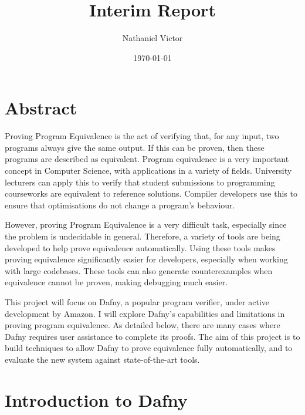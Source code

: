 \documentclass[a4paper, 11pt]{article}
\title{Interim Report}
\author{Nathaniel Victor}
\date{\today}
\begin{document}
\maketitle
\tableofcontents
\lstlistoflistings



\section{Abstract}

Proving Program Equivalence is the act of verifying that, for any input, two programs always give the same output. If this can be proven, then these programs are described as equivalent. Program equivalence is a very important concept in Computer Science, with applications in a variety of fields. University lecturers can apply this to verify that student submissions to programming courseworks are equivalent to reference solutions. Compiler developers use this to ensure that optimisations do not change a program's behaviour. 

However, proving Program Equivalence is a very difficult task, especially since the problem is undecidable in general. Therefore, a variety of tools are being developed to help prove equivalence automatically. Using these tools makes proving equivalence significantly easier for developers, especially when working with large codebases. These tools can also generate counterexamples when equivalence cannot be proven, making debugging much easier. 

This project will focus on Dafny, a popular program verifier, under active development by Amazon. I will explore Dafny's capabilities and limitations in proving program equivalence. As detailed below, there are many cases where Dafny requires user assistance to complete its proofs. The aim of this project is to build techniques to allow Dafny to prove equivalence fully automatically, and to evaluate the new system against state-of-the-art tools.

\section{Introduction to Dafny}
\end{document}

